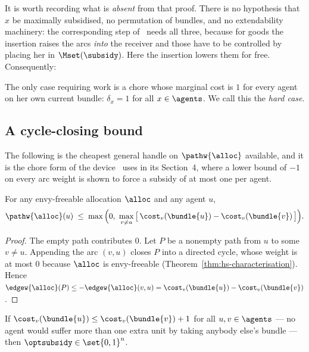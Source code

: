 It is worth recording what is \emph{absent} from that proof. There is no
hypothesis that $x$ be maximally subsidised, no permutation of bundles, and no
extendability machinery: the corresponding step of~\cite{BKNS22} needs all
three, because for goods the insertion raises the arcs \emph{into} the receiver
and those have to be controlled by placing her in $\Mset(\subsidy)$. Here the
insertion lowers them for free. Consequently:

\begin{observation}
\label{obs:hardcase}
The only case requiring work is a chore whose marginal cost is $1$ for every
agent on her own current bundle: $\delta_x = 1$ for all $x \in \agents$. We call
this the \emph{hard case}.
\end{observation}

\subsection{A cycle-closing bound}

The following is the cheapest general handle on $\pathw{\alloc}$ available, and
it is the chore form of the device~\cite{BDNSV20} uses in its Section~4, where a
lower bound of $-1$ on every arc weight is shown to force a subsidy of at most
one per agent.

\begin{theorem}
\label{thm:cyclebound}
For any envy-freeable allocation $\alloc$ and any agent $u$,
\[
  \pathw{\alloc}(u) \;\le\; \max\Big(0, \ \max_{v \ne u}
  \big[\,\cost_v(\bundle{u}) - \cost_v(\bundle{v})\,\big]\Big).
\]
\end{theorem}

\begin{proof}
The empty path contributes $0$. Let $P$ be a nonempty path from $u$ to some
$v \ne u$. Appending the arc $(v,u)$ closes $P$ into a directed cycle, whose
weight is at most $0$ because $\alloc$ is envy-freeable
(Theorem~\ref{thm:hs-characterisation}). Hence
$\edgew{\alloc}(P) \le -\edgew{\alloc}(v,u) = \cost_v(\bundle{u}) -
\cost_v(\bundle{v})$.
\end{proof}

\begin{corollary}
\label{cor:onestep}
If $\cost_v(\bundle{u}) \le \cost_v(\bundle{v}) + 1$ for all $u,v \in \agents$
--- no agent would suffer more than one extra unit by taking anybody else's
bundle --- then $\optsubsidy \in \set{0,1}^n$.
\end{corollary}

